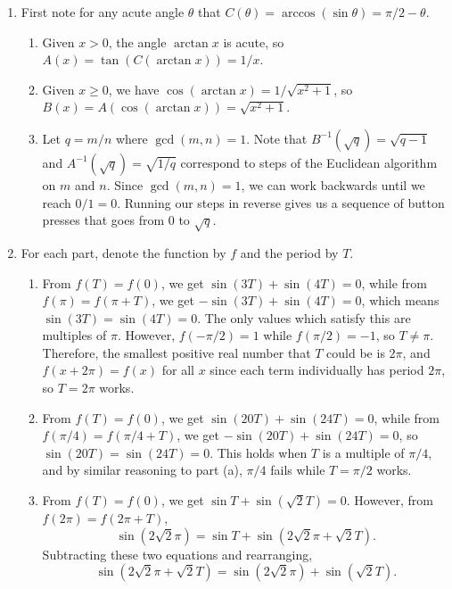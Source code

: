 \begin{enumerate}
$\csc^{-1}$ has domain $(-\infty,-1]\cup [1,+\infty)$ and range $[-\pi/2,0)\cup (0,\pi/2]$;\par
$\cot^{-1}$ has domain $\mathbb{R}$ and range $(0,\pi)$
\item First note for any acute angle $\theta$ that $C(\theta) = \arccos(\sin\theta) = \pi/2 - \theta$.
\begin{enumerate}
\item Given $x > 0$, the angle $\arctan x$ is acute, so $A(x) = \tan(C(\arctan x)) = 1/x$.
\item Given $x\geq 0$, we have $\cos(\arctan x) = 1/\sqrt{x^2 + 1}$, so $B(x) = A(\cos(\arctan x)) = \sqrt{x^2 + 1}$.
\item Let $q = m/n$ where $\gcd(m,n) = 1$. Note that $B^{-1}(\sqrt{q}) = \sqrt{q - 1}$ and $A^{-1}(\sqrt{q}) = \sqrt{1/q}$ correspond to steps of the Euclidean algorithm on $m$ and $n$. Since $\gcd(m,n) = 1$, we can work backwards until we reach $0/1 = 0$. Running our steps in reverse gives us a sequence of button presses that goes from $0$ to $\sqrt{q}$.
\end{enumerate}
\item For each part, denote the function by $f$ and the period by $T$.
\begin{enumerate}
\item From $f(T) = f(0)$, we get $\sin(3T) + \sin(4T) = 0$, while from $f(\pi) = f(\pi + T)$, we get $-\sin(3T) + \sin(4T) = 0$, which means $\sin(3T) = \sin(4T) = 0$. The only values which satisfy this are multiples of $\pi$. However, $f(-\pi/2) = 1$ while $f(\pi/2) = -1$, so $T\neq\pi$. Therefore, the smallest positive real number that $T$ could be is $2\pi$, and $f(x + 2\pi) = f(x)$ for all $x$ since each term individually has period $2\pi$, so $T = 2\pi$ works.
\item From $f(T) = f(0)$, we get $\sin(20T) + \sin(24T) = 0$, while from $f(\pi/4) = f(\pi/4 + T)$, we get $-\sin(20T) + \sin(24T) = 0$, so $\sin(20T) = \sin(24T) = 0$. This holds when $T$ is a multiple of $\pi/4$, and by similar reasoning to part (a), $\pi/4$ fails while $T = \pi/2$ works.
\item From $f(T) = f(0)$, we get $\sin T + \sin(\sqrt{2}T) = 0$. However, from $f(2\pi) = f(2\pi + T)$,
\begin{equation*}
\sin(2\sqrt{2}\pi) = \sin T + \sin(2\sqrt{2}\pi + \sqrt{2}T).
\end{equation*}
Subtracting these two equations and rearranging,
\begin{equation*}
\sin(2\sqrt{2}\pi + \sqrt{2}T) = \sin(2\sqrt{2}\pi) + \sin(\sqrt{2}T).

\end{equation*}
\end{enumerate}
\end{enumerate}

